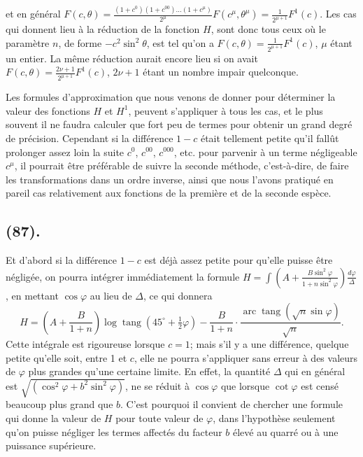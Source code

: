 \documentclass{article}
\begin{document}
et en général $F(c,\theta)=\frac{(1+c^{0})(1+c^{00})\ldots(1+c^{\mu})}{2^{\mu}}F(c^{\mu},\theta^{\mu})=\frac{1}{2^{\mu+1}}F^{1}(c)$. Les cas qui donnent lieu à la réduction de la fonction $H$, sont donc tous ceux où le paramètre $n$, de forme $-c^{2}\sin^{2}\theta$, est tel qu'on a $F(c,\theta)=\frac{1}{2^{\mu+1}}F^{1}(c)$, $\mu$ étant un entier. La même réduction aurait encore lieu si on avait $F(c,\theta)=\frac{2\nu+1}{2^{\mu+1}}F^{1}(c)$, $2\nu+1$ étant un nombre impair quelconque.

Les formules d'approximation que nous venons de donner pour déterminer la valeur des fonctions $H$ et $H^{1}$, peuvent s'appliquer à tous les cas, et le plus souvent il ne faudra calculer que fort peu de termes pour obtenir un grand degré de précision. Cependant si la différence $1-c$ était tellement petite qu'il fallût prolonger assez loin la suite $c^{0}$, $c^{00}$, $c^{000}$, etc. pour parvenir à un terme négligeable $c^{\mu}$, il pourrait être préférable de suivre la seconde méthode, c'est-à-dire, de faire les transformations dans un ordre inverse, ainsi que nous l'avons pratiqué en pareil cas relativement aux fonctions de la première et de la seconde espèce.

\subsection*{(87).}

Et d'abord si la différence $1-c$ est déjà assez petite pour qu'elle puisse être négligée, on pourra intégrer immédiatement la formule $H=\displaystyle\int\left(A+\frac{B\sin^{2}\varphi}{1+n\sin^{2}\varphi}\right)\frac{d\varphi}{\Delta}$, en mettant $\cos\varphi$ au lieu de $\Delta$, ce qui donnera
\[ H=\left(A+\frac{B}{1+n}\right)\log\operatorname{tang}(45^{\circ}+\tfrac{1}{2}\varphi)-\frac{B}{1+n}\cdot\frac{\operatorname{arc}\operatorname{tang}(\sqrt{n}\sin\varphi)}{\sqrt{n}}. \]
Cette intégrale est rigoureuse lorsque $c=1$; mais s'il y a une différence, quelque petite qu'elle soit, entre 1 et $c$, elle ne pourra s'appliquer sans erreur à des valeurs de $\varphi$ plus grandes qu'une certaine limite. En effet, la quantité $\Delta$ qui en général est $\sqrt{(\cos^{2}\varphi+b^{2}\sin^{2}\varphi)}$, ne se réduit à $\cos\varphi$ que lorsque $\cot\varphi$ est censé beaucoup plus grand que $b$. C'est pourquoi il convient de chercher une formule qui donne la valeur de $H$ pour toute valeur de $\varphi$, dans l'hypothèse seulement qu'on puisse négliger les termes affectés du facteur $b$ élevé au quarré ou à une puissance supérieure.
\end{document}
